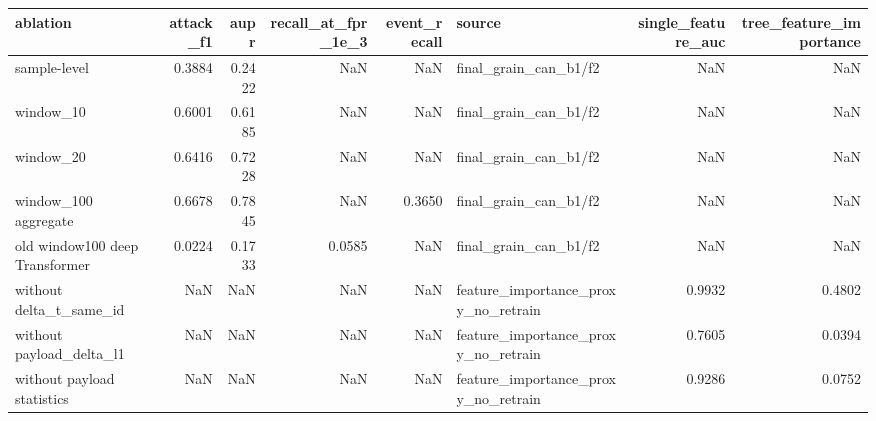\begin{tabular}{lrrrrlrr}
\toprule
ablation & attack_f1 & aupr & recall_at_fpr_1e_3 & event_recall & source & single_feature_auc & tree_feature_importance \\
\midrule
sample-level & 0.3884 & 0.2422 & NaN & NaN & final_grain_can_b1/f2 & NaN & NaN \\
window_10 & 0.6001 & 0.6185 & NaN & NaN & final_grain_can_b1/f2 & NaN & NaN \\
window_20 & 0.6416 & 0.7228 & NaN & NaN & final_grain_can_b1/f2 & NaN & NaN \\
window_100 aggregate & 0.6678 & 0.7845 & NaN & 0.3650 & final_grain_can_b1/f2 & NaN & NaN \\
old window100 deep Transformer & 0.0224 & 0.1733 & 0.0585 & NaN & final_grain_can_b1/f2 & NaN & NaN \\
without delta_t_same_id & NaN & NaN & NaN & NaN & feature_importance_proxy_no_retrain & 0.9932 & 0.4802 \\
without payload_delta_l1 & NaN & NaN & NaN & NaN & feature_importance_proxy_no_retrain & 0.7605 & 0.0394 \\
without payload statistics & NaN & NaN & NaN & NaN & feature_importance_proxy_no_retrain & 0.9286 & 0.0752 \\
\bottomrule
\end{tabular}
